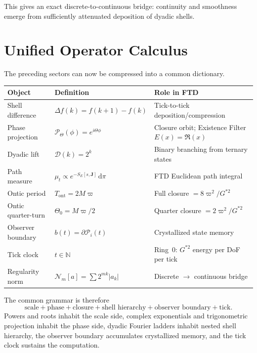 \documentclass[11pt]{article}
\theoremstyle{tight}
\theoremstyle{plainroman}
\newcommand{\N}{\mathbb{N}}
\newcommand{\dd}{\,\mathrm{d}}
\newcommand{\Tont}{T_{\mathrm{ont}}}
\newcommand{\Thetaont}{\Theta_{0}}
\newcommand{\Nreg}{\mathcal{N}}
\newcommand{\causal}{\mathcal{P}}
\begin{document}
This gives an exact discrete-to-continuous bridge: continuity and smoothness emerge from sufficiently attenuated deposition of dyadic shells.

\section{Unified Operator Calculus}

The preceding sectors can now be compressed into a common dictionary.
\begin{center}
\renewcommand{\arraystretch}{1.28}
\begin{tabular}{>{\raggedright\arraybackslash}p{} >{\raggedright\arraybackslash}p{} >{\raggedright\arraybackslash}p{}}
\toprule
\textbf{Object} & \textbf{Definition} & \textbf{Role in FTD} \\
\midrule
Shell difference & $\Delta f(k)=f(k+1)-f(k)$ & Tick-to-tick deposition/compression \\
Phase projection & $\mathcal P_{\Theta}(\phi)=e^{i\Theta\phi}$ & Closure orbit; Existence Filter $E(x)=\Re(x)$ \\
Dyadic lift & $\mathcal D(k)=2^k$ & Binary branching from ternary states \\
Path measure & $\mu_t\propto e^{-S_E[s,\mathbf J]}\dd\pi$ & FTD Euclidean path integral \\
Ontic period & $\Tont = 2M\varpi$ & Full closure $=8\varpi^2/G^{*2}$ \\
Ontic quarter-turn & $\Thetaont = M\varpi/2$ & Quarter closure $=2\varpi^2/G^{*2}$ \\
Observer boundary & $b(t)=\partial\causal_i(t)$ & Crystallized state memory \\
Tick clock & $t\in\N$ & Ring~0: $G^{*2}$ energy per DoF per tick \\
Regularity norm & $\Nreg_m[a]=\sum 2^{mk}|a_k|$ & Discrete $\to$ continuous bridge \\
\bottomrule
\end{tabular}
\end{center}
The common grammar is therefore
\[
\text{scale} + \text{phase} + \text{closure} + \text{shell hierarchy} + \text{observer boundary} + \text{tick}.
\]
Powers and roots inhabit the scale side, complex exponentials and trigonometric projection inhabit the phase side, dyadic Fourier ladders inhabit nested shell hierarchy, the observer boundary accumulates crystallized memory, and the tick clock sustains the computation.
\end{document}
